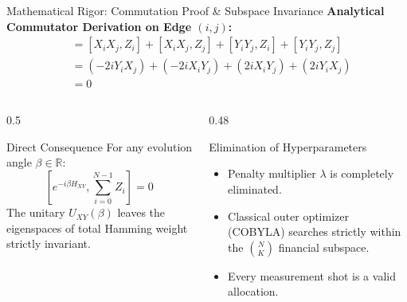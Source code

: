 \documentclass[aspectratio=169,10pt]{beamer}
\begin{document}
\begin{frame}{Mathematical Rigor: Commutation Proof \& Subspace Invariance}
\textbf{Analytical Commutator Derivation on Edge $(i, j)$:}
\begin{align*}
[X_i X_j + Y_i Y_j, Z_i + Z_j] &= [X_i X_j, Z_i] + [X_i X_j, Z_j] + [Y_i Y_j, Z_i] + [Y_i Y_j, Z_j] \\
&= (-2i Y_i X_j) + (-2i X_i Y_j) + (2i X_i Y_j) + (2i Y_i X_j) \\
&= 0
\end{align*}

\begin{columns}
\begin{column}{0.5\textwidth}
\begin{block}{Direct Consequence}
For any evolution angle $\beta \in \mathbb{R}$:
\begin{equation*}
\left[e^{-i \beta H_{XY}}, \sum_{i=0}^{N-1} Z_i\right] = 0
\end{equation*}
The unitary $U_{XY}(\beta)$ leaves the eigenspaces of total Hamming weight strictly invariant.
\end{block}
\end{column}

\begin{column}{0.48\textwidth}
\begin{block}{Elimination of Hyperparameters}
\begin{itemize}
    \item Penalty multiplier $\lambda$ is completely eliminated.
    \item Classical outer optimizer (COBYLA) searches strictly within the $\binom{N}{K}$ financial subspace.
    \item Every measurement shot is a valid allocation.
\end{itemize}
\end{block}
\end{column}
\end{columns}
\end{frame}
\end{document}
